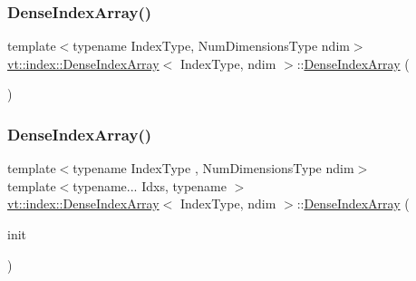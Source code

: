 \mbox{\label{structvt_1_1index_1_1_dense_index_array_a2a9e543ccf3fa97a217ad1c981911634}} 
\subsubsection{\texorpdfstring{Dense\+Index\+Array()}{DenseIndexArray()}\hspace{0.1cm}{\footnotesize\ttfamily [3/6]}}
{\footnotesize\ttfamily template$<$typename Index\+Type, Num\+Dimensions\+Type ndim$>$ \\
\hyperlink{structvt_1_1index_1_1_dense_index_array}{vt\+::index\+::\+Dense\+Index\+Array}$<$ Index\+Type, ndim $>$\+::\hyperlink{structvt_1_1index_1_1_dense_index_array}{Dense\+Index\+Array} (\begin{DoxyParamCaption}\item[{\hyperlink{structvt_1_1index_1_1_dense_index_array}{Dense\+Index\+Array}$<$ Index\+Type, ndim $>$ \&\&}]{ }\end{DoxyParamCaption})\hspace{0.3cm}{\ttfamily [default]}}

\mbox{\label{structvt_1_1index_1_1_dense_index_array_aa866f038df37f085bc6a48a57bcdaaa3}} 
\subsubsection{\texorpdfstring{Dense\+Index\+Array()}{DenseIndexArray()}\hspace{0.1cm}{\footnotesize\ttfamily [4/6]}}
{\footnotesize\ttfamily template$<$typename Index\+Type , Num\+Dimensions\+Type ndim$>$ \\
template$<$typename... Idxs, typename $>$ \\
\hyperlink{structvt_1_1index_1_1_dense_index_array}{vt\+::index\+::\+Dense\+Index\+Array}$<$ Index\+Type, ndim $>$\+::\hyperlink{structvt_1_1index_1_1_dense_index_array}{Dense\+Index\+Array} (\begin{DoxyParamCaption}\item[{Idxs \&\&...}]{init }\end{DoxyParamCaption})\hspace{0.3cm}{\ttfamily [explicit]}}

